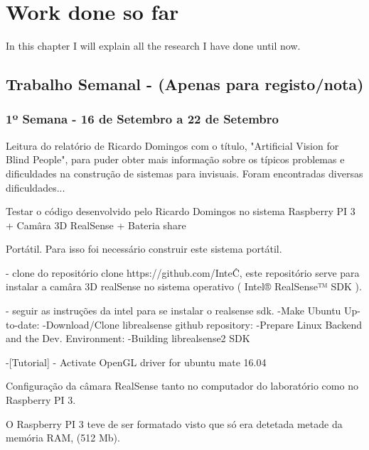 \chapter{Work done so far}
\label{chap:trabalho_semanal}

In this chapter I will explain all the research I have done until now.

\section{Trabalho Semanal - (Apenas para registo/nota)}
\label{chap5:sec:TD}


    \subsection{1º Semana - 16 de Setembro a 22 de Setembro}
    \label{chap5:sec:TD:Semana1}
    
    Leitura do relatório de Ricardo Domingos com o título, "Artificial Vision for Blind People", para puder obter mais informação sobre os típicos problemas e dificuldades na construção de sistemas para invisuais.
    Foram encontradas diversas dificuldades...
    
    Testar o código desenvolvido pelo Ricardo Domingos no sistema Raspberry PI 3 + Camâra 3D RealSense + Bateria share
    
    
    Portátil. Para isso foi necessário construir este sistema portátil.
    
        - clone do repositório clone https://github.com/Inte\^C, este repositório serve para instalar a camâra 3D realSense no sistema operativo ( Intel® RealSense™ SDK ).
        
        - seguir as instruções da intel para se instalar o realsense sdk. 
            -Make Ubuntu Up-to-date:
            -Download/Clone librealsense github repository:
            -Prepare Linux Backend and the Dev. Environment:
            -Building librealsense2 SDK\    
            
        -[Tutorial] - Activate OpenGL driver for ubuntu mate 16.04

    \bigskip
    
    Configuração da câmara RealSense tanto no computador do laboratório como no Raspberry PI 3.
    
    \bigskip
    
    O Raspberry PI 3 teve de ser formatado visto que só era detetada metade da memória RAM, (512 Mb). 
    
